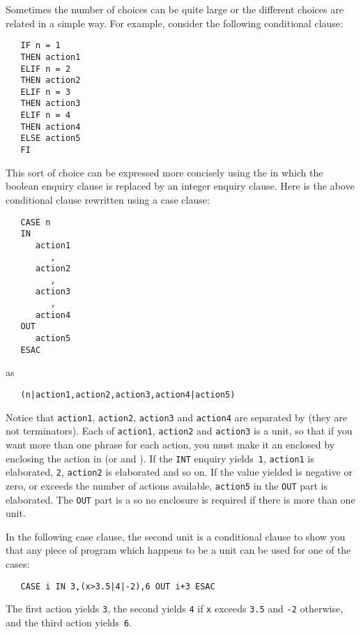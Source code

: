 Sometimes the number of choices can be quite large or the different
choices are related in a simple way. For example, consider the
following conditional clause:
\begin{verbatim}
   IF n = 1
   THEN action1
   ELIF n = 2
   THEN action2
   ELIF n = 3
   THEN action3
   ELIF n = 4
   THEN action4
   ELSE action5
   FI
\end{verbatim}
\noindent
This sort of choice can be expressed more concisely using the
 in which the boolean enquiry
clause is replaced by an integer enquiry clause. Here is the above
conditional clause rewritten using a case clause:
\begin{verbatim}
   CASE n
   IN
      action1
         ,
      action2
         ,
      action3
         ,
      action4
   OUT
      action5
   ESAC
\end{verbatim}
\noindent
{} 
 as
\begin{verbatim}
   (n|action1,action2,action3,action4|action5)
\end{verbatim}
\noindent
Notice that \verb|action1|, \verb|action2|, \verb|action3| and
\verb|action4| are separated by  (they are not
terminators). Each of \verb|action1|, \verb|action2| and
\verb|action3| is a unit, so that if you want more than one phrase
for each action, you must make it an enclosed
 by enclosing the action in
 (or  and ). If the \verb|INT|
enquiry  yields~\verb|1|, \verb|action1|
is elaborated, \verb|2|, \verb|action2| is elaborated and so on. If
the value yielded is negative or zero, or exceeds the number of
actions available, \verb|action5| in the \verb|OUT| part is
elaborated.  The \verb|OUT| part is a
 so no enclosure is required if
there is more than one unit.

In the following case clause, the second unit is a conditional clause
to show you that any piece of program which happens to be a unit can
be used for one of the cases:
\begin{verbatim}
   CASE i IN 3,(x>3.5|4|-2),6 OUT i+3 ESAC
\end{verbatim}
\noindent
The first action yields \verb|3|, the second yields \verb|4| if
\verb|x| exceeds \verb|3.5| and \verb|-2| otherwise, and the third
action yields~\verb|6|.


